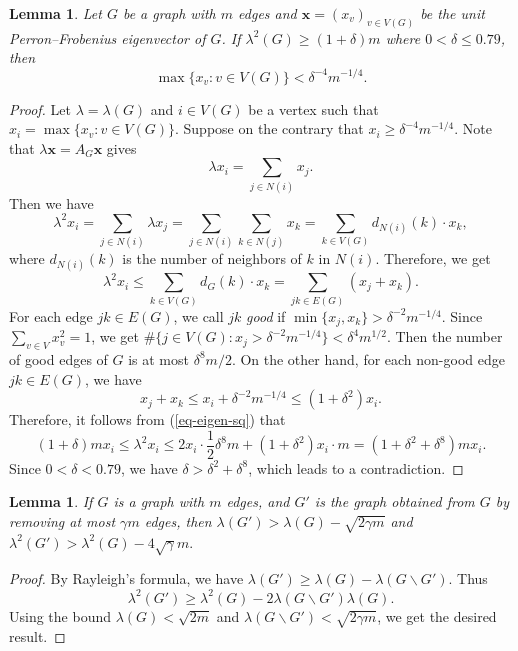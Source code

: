 \documentclass[11pt,a4paper]{article}
\newtheorem{lemma}[theorem]{Lemma}
\theoremstyle{definition}
\theoremstyle{remark}
\begin{document}
\begin{lemma} \label{lem:max} 
Let $G$ be a graph with $m$ edges and $\bm{x}=(x_v)_{v\in V(G)}$ be the unit Perron--Frobenius eigenvector of $G$.  
 If $\lambda^2 (G) \ge (1+\delta)m$ where $0<\delta \le 0.79$, then 
\[ \max\{x_v : v\in V(G)\} < {\delta^{-4}m^{-1/4} }. \] 
\end{lemma}
\begin{proof}
Let $\lambda = \lambda (G)$ and 
$i\in V(G)$ be a vertex such that 
$x_i= \max\{x_v : v\in V(G)\}$. 
Suppose on the contrary that 
$x_i \ge \delta^{-4}m^{-1/4}$. Note that $\lambda \bm{x}= A_G \bm{x}$ gives 
\[ \lambda x_i = \sum_{j\in N(i)} x_j. \] 
Then we have 
\[  \lambda^2 x_i = \sum_{j\in N(i)} \lambda x_j= \sum_{j\in N(i)} 
\sum_{k\in N(j)} x_k = \sum_{k\in V(G)} d_{N(i)}(k) \cdot x_k , \]
where $d_{N(i)}(k)$ is the number of neighbors of $k$ in $N(i)$. Therefore, we get 
\begin{equation}\label{eq-eigen-sq}
\lambda^2 x_i \le \sum_{k\in V(G)} d_G(k)\cdot x_k = \sum_{jk \in E(G)}(x_j +x_k). 
\end{equation} 
For each edge $jk\in E(G)$, we call $jk$ \emph{good} if $\min\{ x_j ,x_k \} > \delta^{-2} m^{-1/4}$. Since 
$\sum_{v\in V} x_v^2 =1$, we get $\#\{ j\in V(G): x_j > \delta^{-2}m^{-1/4}\}  <  \delta^4 m^{1/2}$. Then 
the number of good edges of $G$ is at most $\delta^8m/2$. 
On the other hand, for each non-good edge 
$jk \in E(G)$, we have 
\[  x_j +x_k 
\le x_i + \delta^{-2} m^{-1/4} \le (1+\delta^2)x_i. \]  
Therefore, it follows from (\ref{eq-eigen-sq}) that 
\[  (1+\delta )m x_i \le \lambda^2 x_i \le 
2x_i \cdot \frac{1}{2} \delta^8m + (1+\delta^2) x_i \cdot m=(1+\delta^2 +\delta^8)mx_i . \]
Since $0<\delta <0.79$, we have 
$\delta > \delta^2 + \delta^8$, 
which leads to a contradiction. 
\end{proof}




\begin{lemma}
    \label{lem:remove-edges}
    If $G$ is a graph with $m$ edges, and $G'$ is the graph obtained from $G$ by removing at most $\gamma m$ edges, then $\lambda (G')> \lambda (G) - \sqrt{2\gamma m}$ and 
    $\lambda^2(G') > \lambda^2(G) - 4 \sqrt{\gamma} m.$
\end{lemma}

\begin{proof}
    By Rayleigh's formula, we have $\lambda(G') \geq \lambda(G) - \lambda(G \backslash G')$. Thus
    $$\lambda^2(G') \geq \lambda^2(G) - 2 \lambda(G \backslash G') \lambda(G).$$
    Using the bound $\lambda(G) < \sqrt{2m}$ and $\lambda(G \backslash G') < \sqrt{2 \gamma m}$, we get the desired result.
\end{proof}
\end{document}
